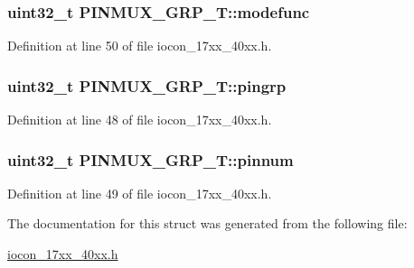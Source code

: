 \subsubsection[{\texorpdfstring{modefunc}{modefunc}}]{\setlength{\rightskip}{0pt plus 5cm}uint32\+\_\+t P\+I\+N\+M\+U\+X\+\_\+\+G\+R\+P\+\_\+\+T\+::modefunc}\hypertarget{structPINMUX__GRP__T_a32ddff5b2f6776cc4c3d22e14c85d75a}{}\label{structPINMUX__GRP__T_a32ddff5b2f6776cc4c3d22e14c85d75a}


Definition at line 50 of file iocon\+\_\+17xx\+\_\+40xx.\+h.

\subsubsection[{\texorpdfstring{pingrp}{pingrp}}]{\setlength{\rightskip}{0pt plus 5cm}uint32\+\_\+t P\+I\+N\+M\+U\+X\+\_\+\+G\+R\+P\+\_\+\+T\+::pingrp}\hypertarget{structPINMUX__GRP__T_a500436bd5b250eda1bac290e285d9e0d}{}\label{structPINMUX__GRP__T_a500436bd5b250eda1bac290e285d9e0d}


Definition at line 48 of file iocon\+\_\+17xx\+\_\+40xx.\+h.

\subsubsection[{\texorpdfstring{pinnum}{pinnum}}]{\setlength{\rightskip}{0pt plus 5cm}uint32\+\_\+t P\+I\+N\+M\+U\+X\+\_\+\+G\+R\+P\+\_\+\+T\+::pinnum}\hypertarget{structPINMUX__GRP__T_a7e2e3cb5f08e82cdad3ff8b215d0d448}{}\label{structPINMUX__GRP__T_a7e2e3cb5f08e82cdad3ff8b215d0d448}


Definition at line 49 of file iocon\+\_\+17xx\+\_\+40xx.\+h.



The documentation for this struct was generated from the following file\+:\begin{DoxyCompactItemize}
\item 
\hyperlink{iocon__17xx__40xx_8h}{iocon\+\_\+17xx\+\_\+40xx.\+h}\end{DoxyCompactItemize}
